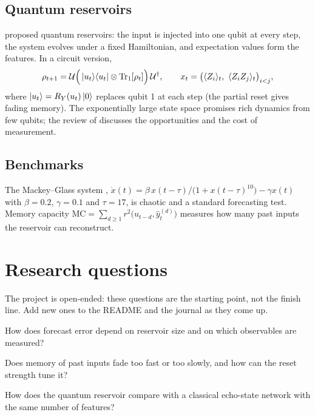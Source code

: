 \documentclass[11pt,a4paper]{article}
\begin{document}
\subsection{Quantum reservoirs}
\citet{fujii2017} proposed quantum reservoirs: the input is injected into one qubit at every step,
the system evolves under a fixed Hamiltonian, and expectation values form the features. In a circuit
version,
\begin{equation}
  \rho_{t+1}=\mathcal{U}\Big(\ket{u_t}\!\bra{u_t}\otimes\operatorname{Tr}_1[\rho_t]\Big)\,\mathcal{U}^\dagger,\qquad
  x_t=\big(\langle Z_i\rangle_t,\ \langle Z_iZ_j\rangle_t\big)_{i<j},
\end{equation}
where $\ket{u_t}=R_Y(u_t)\ket{0}$ replaces qubit 1 at each step (the partial reset gives fading
memory). The exponentially large state space promises rich dynamics from few qubits; the review of
\citet{mujal2021} discusses the opportunities and the cost of measurement.

\subsection{Benchmarks}
The Mackey--Glass system \citep{mackey1977},
$\dot x(t)=\beta\,x(t-\tau)/\big(1+x(t-\tau)^{10}\big)-\gamma x(t)$ with $\beta=0.2$, $\gamma=0.1$ and
$\tau=17$, is chaotic and a standard forecasting test. Memory capacity
$\mathrm{MC}=\sum_{d\ge1}r^2\big(u_{t-d},\hat y^{(d)}_t\big)$ measures how many past inputs the
reservoir can reconstruct.

\section{Research questions}
The project is open-ended: these questions are the starting point, not the finish line. Add new
ones to the README and the journal as they come up.

\begin{rqlist}
  \item How does forecast error depend on reservoir size and on which observables are measured?
  \item Does memory of past inputs fade too fast or too slowly, and how can the reset strength tune it?
  \item How does the quantum reservoir compare with a classical echo-state network with the same number of features?
\end{rqlist}
\end{document}
